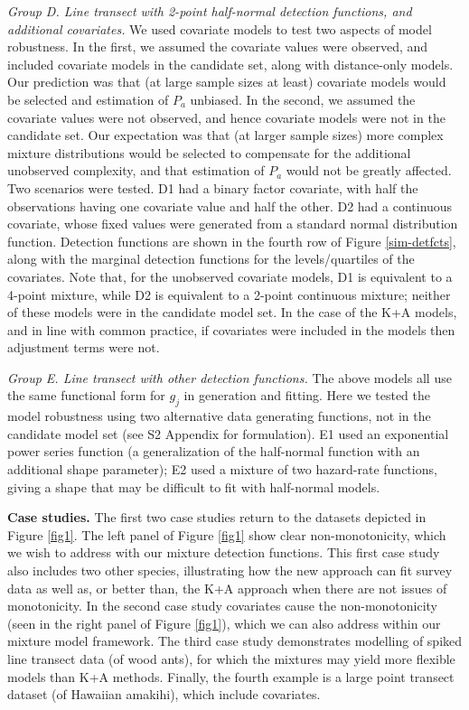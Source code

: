 \documentclass[10pt]{article}
\begin{document}
\textit{Group D. Line transect with 2-point half-normal detection functions, and additional covariates.}  We used covariate models to test two aspects of model robustness. In the first, we assumed the covariate values were observed, and included covariate models in the candidate set, along with distance-only models. Our prediction was that (at large sample sizes at least) covariate models would be selected and estimation of $P_a$ unbiased.  In the second, we assumed the covariate values were not observed, and hence covariate models were not in the candidate set.  Our expectation was that (at larger sample sizes) more complex mixture distributions would be selected to compensate for the additional unobserved complexity, and that estimation of $P_a$ would not be greatly affected.  Two scenarios were tested.  D1 had a binary factor covariate, with half the observations having one covariate value and half the other.  D2 had a continuous covariate, whose fixed values were generated from a standard normal distribution function.  Detection functions are shown in the fourth row of Figure \ref{sim-detfcts}, along with the marginal detection functions for the levels/quartiles of the covariates. Note that, for the unobserved covariate models, D1 is equivalent to a 4-point mixture, while D2 is equivalent to a 2-point continuous mixture; neither of these models were in the candidate model set.  In the case of the K+A models, and in line with common practice, if covariates were included in the models then adjustment terms were not.

\textit{Group E. Line transect with other detection functions.} The above models all use the same functional form for $g_j$ in generation and fitting.  Here we tested the model robustness using two alternative data generating functions, not in the candidate model set (see S2 Appendix for formulation).  E1 used an exponential power series function (a generalization of the half-normal function with an additional shape parameter); E2 used a mixture of two hazard-rate functions, giving a shape that may be difficult to fit with half-normal models.

\textbf{Case studies.} The first two case studies return to the datasets depicted in Figure \ref{fig1}. The left panel of Figure \ref{fig1} show clear non-monotonicity, which we wish to address with our mixture detection functions. This first case study also includes two other species, illustrating how the new approach can fit survey data as well as, or better than, the K+A approach when there are not issues of monotonicity. In the second case study covariates cause the non-monotonicity (seen in the right panel of Figure \ref{fig1}), which we can also address within our mixture model framework.  The third case study demonstrates modelling of spiked line transect data (of wood ants), for which the mixtures may yield more flexible models than K+A methods. Finally, the fourth example is a large point transect dataset (of Hawaiian amakihi), which include covariates.
\end{document}
